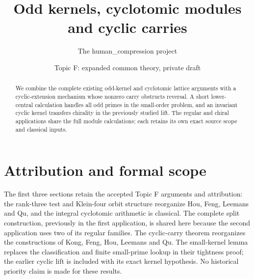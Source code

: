 
\title{Odd kernels, cyclotomic modules and cyclic carries}
\author{The human\_compression project}\date{Topic F: expanded common theory, private draft}
\maketitle
\begin{abstract}
We combine the complete existing odd-kernel and cyclotomic lattice
arguments with a cyclic-extension mechanism whose nonzero carry
obstructs reversal. A short lower-central calculation handles all
odd primes in the small-order problem, and an invariant cyclic
kernel transfers chirality in the previously studied lift. The
regular and chiral applications share the full module calculations;
each retains its own exact source scope and classical inputs.
\end{abstract}








\section{Attribution and formal scope}
The first three sections retain the accepted Topic F arguments and
attribution: the rank-three test and Klein-four orbit structure
reorganize Hou, Feng, Leemans and Qu, and the integral cyclotomic
arithmetic is classical. The complete split construction, previously
in the first application, is shared here because the second
application uses two of its regular families.
The cyclic-carry theorem reorganizes the constructions of Kong,
Feng, Hou, Leemans and Qu. The small-kernel lemma replaces the
classification and finite small-prime lookup in their tightness
proof; the earlier cyclic lift is included with its exact kernel
hypothesis. No historical priority claim is made for these results.

